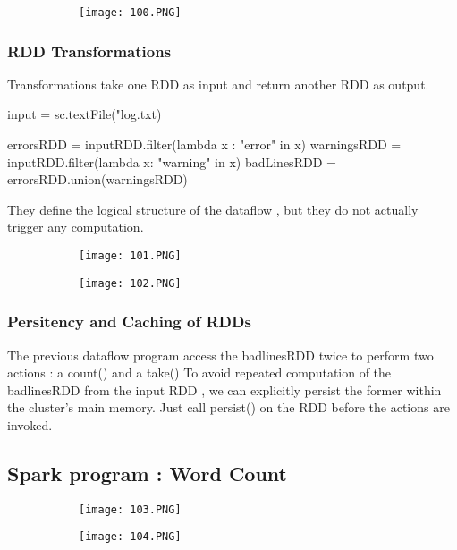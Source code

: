\documentclass{article}
\begin{document}
\begin{figure}[ht!]
  \centering
  \begin{subfigure}[b]{0.5\linewidth}
    \texttt{[image: 100.PNG]}
  \end{subfigure}
\end{figure}

\subsubsection{RDD Transformations}
Transformations take one RDD as input and return another RDD as output.

input = sc.textFile("log.txt)

errorsRDD = inputRDD.filter(lambda x : "error" in x)
warningsRDD = inputRDD.filter(lambda x: "warning" in x)
badLinesRDD = errorsRDD.union(warningsRDD)


They define the logical structure of the dataflow , but they do not actually trigger any computation.

\begin{figure}[ht!]
  \centering
  \begin{subfigure}[b]{0.5\linewidth}
    \texttt{[image: 101.PNG]}
  \end{subfigure}
     \begin{subfigure}[b]{0.4\textwidth}
         \centering
         \texttt{[image: 102.PNG]}
     \end{subfigure}
\end{figure}

\subsubsection{Persitency and Caching of RDDs}

The previous dataflow program access the badlinesRDD twice to perform two actions : a count() and a take()
To avoid repeated computation of the badlinesRDD from the input RDD , we can explicitly persist the former within the cluster's main memory.
Just call persist() on the RDD before the actions are invoked.

\subsection{Spark program : Word Count}

\begin{figure}[ht!]
  \centering
  \begin{subfigure}[b]{0.5\linewidth}
    \texttt{[image: 103.PNG]}
  \end{subfigure}
     \begin{subfigure}[b]{0.4\textwidth}
         \centering
         \texttt{[image: 104.PNG]}
     \end{subfigure}
\end{figure}
\end{document}
